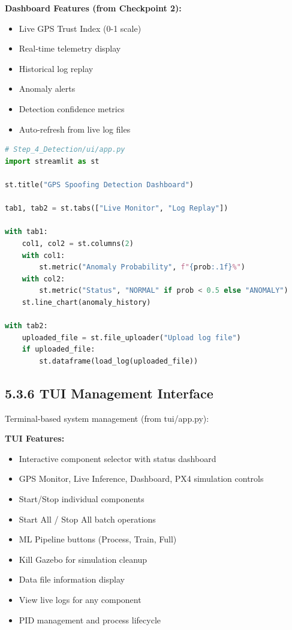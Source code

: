 \documentclass[12pt,a4paper]{article}
\begin{document}
\textbf{Dashboard Features (from Checkpoint 2):}
\begin{itemize}
    \item Live GPS Trust Index (0-1 scale)
    \item Real-time telemetry display
    \item Historical log replay
    \item Anomaly alerts
    \item Detection confidence metrics
    \item Auto-refresh from live log files
\end{itemize}

\begin{lstlisting}[language=python, style=pythonstyle]
# Step_4_Detection/ui/app.py
import streamlit as st

st.title("GPS Spoofing Detection Dashboard")

tab1, tab2 = st.tabs(["Live Monitor", "Log Replay"])

with tab1:
    col1, col2 = st.columns(2)
    with col1:
        st.metric("Anomaly Probability", f"{prob:.1f}%")
    with col2:
        st.metric("Status", "NORMAL" if prob < 0.5 else "ANOMALY")
    st.line_chart(anomaly_history)

with tab2:
    uploaded_file = st.file_uploader("Upload log file")
    if uploaded_file:
        st.dataframe(load_log(uploaded_file))
\end{lstlisting}

\subsection{5.3.6 TUI Management Interface}

Terminal-based system management (from tui/app.py):

\textbf{TUI Features:}
\begin{itemize}
    \item Interactive component selector with status dashboard
    \item GPS Monitor, Live Inference, Dashboard, PX4 simulation controls
    \item Start/Stop individual components
    \item Start All / Stop All batch operations
    \item ML Pipeline buttons (Process, Train, Full)
    \item Kill Gazebo for simulation cleanup
    \item Data file information display
    \item View live logs for any component
    \item PID management and process lifecycle
\end{itemize}
\end{document}
